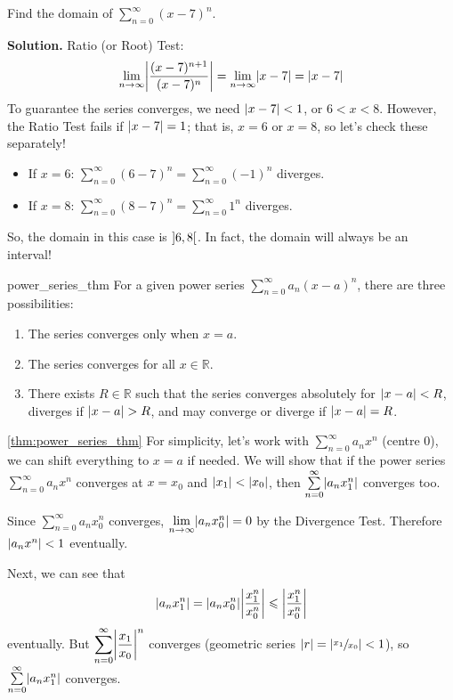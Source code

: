 \begin{Example}{}{}
    Find the domain of $ \displaystyle \sum\limits_{n=0}^{\infty} (x-7)^n $.

    \textbf{Solution.} Ratio (or Root) Test:
    \[ \lim\limits_{{n} \to {\infty}} \abs*{\frac{(x-7)^{n+1}}{(x-7)^n}}
        =\lim\limits_{{n} \to {\infty}} \abs{x-7}
        =\abs{x-7} \]
    To guarantee the series converges, we need $ \abs{x-7}<1 $,
    or $ 6<x<8 $. However, the Ratio Test fails if $ \abs{x-7}=1 $; that is,
    $ x=6 $ or $ x=8 $, so let's check these separately!
    \begin{itemize}
        \item If $ x=6 $: $ \sum\limits_{n=0}^{\infty} (6-7)^n=\sum\limits_{n=0}^{\infty} (-1)^n $
              diverges.
        \item If $ x=8 $: $ \sum\limits_{n=0}^{\infty} (8-7)^n=\sum\limits_{n=0}^{\infty}1^n $
              diverges.
    \end{itemize}
    So, the domain in this case is $ \interval[open]{6}{8} $.
    In fact, the domain will always be an interval!
\end{Example}

\begin{Theorem}{}{power_series_thm}
    For a given power series $ \sum\limits_{n=0}^{\infty} a_n(x-a)^n $, there are
    three possibilities:
    \begin{enumerate}[label=(\arabic*)]
        \item\label{power_1} The series converges only when $ x=a $.
        \item\label{power_2} The series converges for all $ x\in\mathbb{R} $.
        \item\label{power_3} There exists $ R\in\mathbb{R} $ such that the series converges
              absolutely for $ \abs{x-a}<R $, diverges if $ \abs{x-a}>R $, and may converge
              or diverge if $ \abs{x-a}=R $.
    \end{enumerate}
\end{Theorem}

\begin{Proof}{\ref{thm:power_series_thm}}{}
    For simplicity, let's work with $ \sum\limits_{n=0}^{\infty} a_n x^n $ (centre 0),
    we can shift everything to $ x=a $ if needed. We will show that if the power series
    $ \sum\limits_{n=0}^{\infty} a_n x^n $ converges at $ x=x_0 $ and $ \abs{x_1}<\abs{x_0} $,
    then $ \sum\limits_{n=0}^{\infty} \abs*{a_n x_1^n} $ converges too.

    Since
    $ \sum\limits_{n=0}^{\infty} a_n x_0^n $ converges, $ \lim\limits_{{n} \to {\infty}}
        \abs*{a_n x_0^n}=0 $ by the Divergence Test. Therefore $ \abs{a_n x^n}<1 $ eventually.

    Next, we can see that
    \[ \abs*{a_n x_1^n}=\abs*{a_n x_0^n}\abs*{\frac{x_1^n}{x_0^n}}\leqslant \abs*{\frac{x_1^n}{x_0^n}} \]
    eventually. But $ \displaystyle \sum\limits_{n=0}^{\infty} \abs*{\frac{x_1}{x_0}}^n $ converges
    (geometric series $ \abs{r}=\abs*{\sfrac{x_1}{x_0}}<1 $), so $ \sum\limits_{n=0}^{\infty}
        \abs{a_n x_1^n} $
    converges.
\end{Proof}

